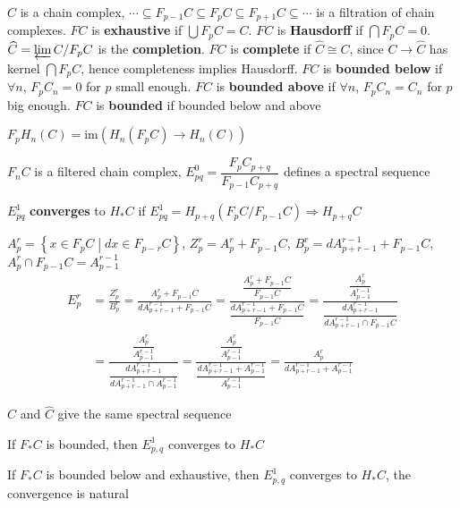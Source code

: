 \documentclass[../main.tex]{subfiles}
\begin{document}
\begin{definition}
$C$ is a chain complex, $\cdots\subseteq F_{p-1}C\subseteq F_pC\subseteq F_{p+1}C\subseteq\cdots$ is a filtration of chain complexes. $FC$ is \textbf{exhaustive} if $\bigcup F_pC=C$. $FC$ is \textbf{Hausdorff} if $\bigcap F_pC=0$. $\widehat C=\varprojlim C/F_pC$ is the \textbf{completion}. $FC$ is \textbf{complete} if $\widehat C\cong C$, since $C\to\widehat C$ has kernel $\bigcap F_pC$, hence completeness implies Hausdorff. $FC$ is \textbf{bounded below} if $\forall n$, $F_pC_n=0$ for $p$ small enough. $FC$ is \textbf{bounded above} if $\forall n$, $F_pC_n=C_n$ for $p$ big enough. $FC$ is \textbf{bounded} if bounded below and above \par
$F_pH_n(C)=\mathrm{im}(H_n(F_pC)\to H_n(C))$
\end{definition}

\begin{definition}
$F_nC$ is a filtered chain complex, $E^0_{pq}=\dfrac{F_pC_{p+q}}{F_{p-1}C_{p+q}}$ defines a spectral sequence \par
$E^1_{pq}$ \textbf{converges} to $H_*C$ if $E^1_{pq}=H_{p+q}(F_pC/F_{p-1}C)\Rightarrow H_{p+q}C$
\end{definition}

\begin{theorem}
$A^r_p=\left\{x\in F_pC\middle|dx\in F_{p-r}C\right\}$, $Z_p^r=A_p^r+F_{p-1}C$, $B^r_p=dA^{r-1}_{p+r-1}+F_{p-1}C$, $A^r_p\cap F_{p-1}C=A^{r-1}_{p-1}$
\begin{align*}
E^r_p&=\frac{Z^r_p}{B^r_p}=\frac{A^r_p+F_{p-1}C}{dA^{r-1}_{p+r-1}+F_{p-1}C}=\frac{\dfrac{A^r_p+F_{p-1}C}{F_{p-1}C}}{\dfrac{dA^{r-1}_{p+r-1}+F_{p-1}C}{F_{p-1}C}}=\frac{\dfrac{A^r_p}{A^{r-1}_{p-1}}}{\dfrac{dA^{r-1}_{p+r-1}}{dA^{r-1}_{p+r-1}\cap F_{p-1}C}} \\
&=\frac{\dfrac{A^r_p}{A^{r-1}_{p-1}}}{\dfrac{dA^{r-1}_{p+r-1}}{dA^{r-1}_{p+r-1}\cap A_{p-1}^{r-1}}}=\frac{\dfrac{A^r_p}{A^{r-1}_{p-1}}}{\dfrac{dA^{r-1}_{p+r-1}+A_{p-1}^{r-1}}{A_{p-1}^{r-1}}}=\frac{A^r_p}{dA^{r-1}_{p+r-1}+A_{p-1}^{r-1}}
\end{align*}
\end{theorem}

\begin{lemma}
$C$ and $\widehat C$ give the same spectral sequence
\end{lemma}

\begin{theorem}
If $F_*C$ is bounded, then $E^1_{p,q}$ converges to $H_*C$ \par
If $F_*C$ is bounded below and exhaustive, then $E^1_{p,q}$ converges to $H_*C$, the convergence is natural
\end{theorem}
\end{document}
